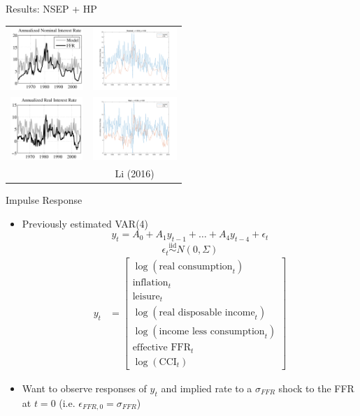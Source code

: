 \documentclass{beamer}
\begin{document}
\begin{frame}{Results: NSEP + HP}
\begin{center}
\begin{tabular}{cc}
\includegraphics[height=90px]{figs/implied_ffr/nominal_4_collard.png} &
\includegraphics[height=90px]{figs/implied_ffr/nominal_4.png} \\
\includegraphics[height=90px]{figs/implied_ffr/real_4_collard.png} &
\includegraphics[height=90px]{figs/implied_ffr/real_4.png} \\
\cite{collard11} & Li (2016)
\end{tabular}
\end{center}
\end{frame}

\begin{frame}{Impulse Response}
\begin{itemize}
\item Previously estimated VAR(4)
$$y_t = A_0 + A_1 y_{t-1} + \ldots + A_4 y_{t-4} + \epsilon_t$$
$$\epsilon_t \overset{\text{iid}}{\sim} N(0, \Sigma)$$
\begin{align*}
y_t &= \begin{bmatrix} \log(\text{real consumption}_t) \\ \text{inflation}_t \\ \text{leisure}_t \\ \log(\text{real disposable income}_t) \\ \log(\text{income less consumption}_t) \\ \text{effective FFR}_t \\ \log(\text{CCI}_t) \end{bmatrix}
\end{align*}
\item Want to observe responses of $y_t$ and implied rate to a $\sigma_{FFR}$ shock to the FFR at $t = 0$ (i.e. $\epsilon_{FFR,0} = \sigma_{FFR}$)
\end{itemize}
\end{frame}
\end{document}
